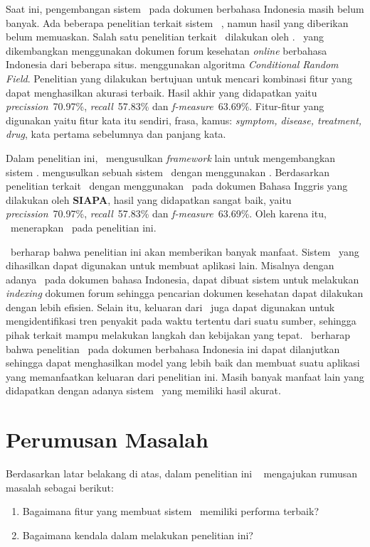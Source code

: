 	Saat ini, pengembangan sistem \mer~pada dokumen berbahasa Indonesia masih belum banyak. Ada beberapa penelitian terkait sistem \mer~, namun hasil yang diberikan belum memuaskan. Salah satu penelitian terkait \mer~dilakukan oleh \cite{skripsiKakRadit}. \mer~yang dikembangkan menggunakan dokumen forum kesehatan \textit{online} berbahasa Indonesia dari beberapa situs. \cite{skripsiKakRadit} menggunakan algoritma \textit{Conditional Random Field}. Penelitian yang dilakukan bertujuan untuk mencari kombinasi fitur yang dapat menghasilkan akurasi terbaik. Hasil akhir yang didapatkan yaitu \textit{precission}~70.97\%, \textit{recall}~57.83\% dan \textit{f-measure}~63.69\%. Fitur-fitur yang digunakan yaitu fitur kata itu sendiri, frasa, kamus: \textit{symptom, disease, treatment, drug}, kata pertama sebelumnya dan panjang kata.

	Dalam penelitian ini, \saya~mengusulkan \textit{framework} lain untuk mengembangkan sistem \mer. \Saya mengusulkan sebuah sistem \mer~dengan menggunakan \rnn. Berdasarkan penelitian terkait \mer~dengan menggunakan \rnn~pada dokumen Bahasa Inggris yang dilakukan oleh \textbf{SIAPA}, hasil yang didapatkan sangat baik, yaitu \textit{precission}~70.97\%, \textit{recall}~57.83\% dan \textit{f-measure}~63.69\%. Oleh karena itu, \saya~menerapkan \rnn~pada penelitian ini.
		
	\Saya~berharap bahwa penelitian ini akan memberikan banyak manfaat. Sistem \mer~yang dihasilkan dapat digunakan untuk membuat aplikasi lain. Misalnya dengan adanya \mer~pada dokumen bahasa Indonesia, dapat dibuat sistem untuk melakukan \textit{indexing} dokumen forum sehingga pencarian dokumen kesehatan dapat dilakukan dengan lebih efisien. Selain itu, keluaran dari \mer~juga dapat digunakan untuk mengidentifikasi tren penyakit pada waktu tertentu dari suatu sumber, sehingga pihak terkait mampu melakukan langkah dan kebijakan yang tepat. \Saya~berharap bahwa penelitian \mer~pada dokumen berbahasa Indonesia ini dapat dilanjutkan sehingga dapat menghasilkan model yang lebih baik dan membuat suatu aplikasi yang memanfaatkan keluaran dari penelitian ini. Masih banyak manfaat lain yang didapatkan dengan adanya sistem \mer~yang memiliki hasil akurat. 

\section{Perumusan Masalah}
Berdasarkan latar belakang di atas, dalam penelitian ini \saya~ mengajukan rumusan masalah sebagai berikut:
\begin{enumerate}
	\item Bagaimana fitur yang membuat sistem \mer~memiliki performa terbaik?
	\item Bagaimana kendala dalam melakukan penelitian ini?
\end{enumerate}

